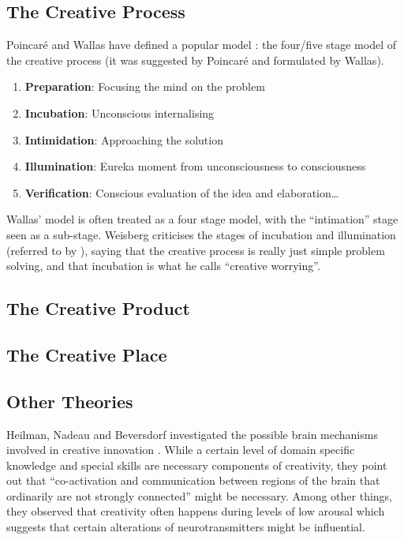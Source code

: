 \subsection{The Creative Process}

Poincaré and Wallas \citep{Wallas1926} have defined a popular model \citep{Boden2003, Partridge1994, Koestler1964}: the four/five stage model of the creative process (it was suggested by Poincaré and formulated by Wallas).

\begin{enumerate}
  \item \textbf{Preparation}: Focusing the mind on the problem
  \item \textbf{Incubation}: Unconscious internalising
  \item \textbf{Intimidation}: Approaching the solution
  \item \textbf{Illumination}: Eureka moment from unconsciousness to consciousness
  \item \textbf{Verification}: Conscious evaluation of the idea and elaboration…
\end{enumerate}

Wallas' model is often treated as a four stage model, with the ``intimation'' stage seen as a sub-stage. Weisberg criticises the stages of incubation and illumination (referred to by \citep{Leary1964}), saying that the creative process is really just simple problem solving, and that incubation is what he calls ``creative worrying''.

\subsection{The Creative Product}
\subsection{The Creative Place}
\subsection*{Other Theories}

Heilman, Nadeau and Beversdorf investigated the possible brain mechanisms involved in creative innovation \citep{Heilman2003}. While a certain level of domain specific knowledge and special skills are necessary components of creativity, they point out that ``co-activation and communication between regions of the brain that ordinarily are not strongly connected'' might be necessary. Among other things, they observed that creativity often happens during levels of low arousal which suggests that certain alterations of neurotransmitters might be influential.

